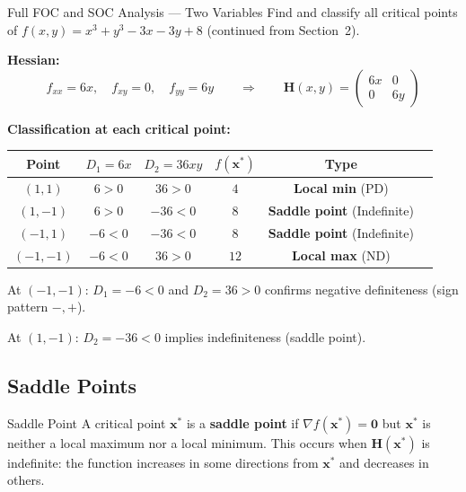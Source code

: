 \documentclass[12pt, a4paper]{article}
\theoremstyle{definition}
\newcommand{\bx}{\mathbf{x}}
\newcommand{\bz}{\mathbf{0}}
\newcommand{\bH}{\mathbf{H}}
\begin{document}
\begin{exbox}{Full FOC and SOC Analysis --- Two Variables}
Find and classify all critical points of
$f(x,y) = x^3 + y^3 - 3x - 3y + 8$ (continued from Section~2).

\textbf{Hessian:}
\[
  f_{xx} = 6x, \quad f_{xy} = 0, \quad f_{yy} = 6y
  \qquad\Rightarrow\qquad
  \bH(x,y) = \begin{pmatrix} 6x & 0 \\ 0 & 6y \end{pmatrix}
\]

\textbf{Classification at each critical point:}
\smallskip

\begin{center}
\begin{tabular}{cccccl}
  \toprule
  \rowcolor{tabhead}
  \color{white}Point & \color{white}$D_1 = 6x$ & \color{white}$D_2 = 36xy$
  & \color{white}$f(\bx^*)$ & \color{white}Type \\
  \midrule
  $(1,1)$   & $6>0$  & $36>0$   & $4$  & \textbf{Local min} (PD) \\
  \rowcolor{tabeven}
  $(1,-1)$  & $6>0$  & $-36<0$  & $8$  & \textbf{Saddle point} (Indefinite) \\
  $(-1,1)$  & $-6<0$ & $-36<0$  & $8$  & \textbf{Saddle point} (Indefinite) \\
  \rowcolor{tabeven}
  $(-1,-1)$ & $-6<0$ & $36>0$   & $12$ & \textbf{Local max} (ND) \\
  \bottomrule
\end{tabular}
\end{center}

\medskip
At $(-1,-1)$: $D_1=-6<0$ and $D_2=36>0$ confirms negative definiteness
(sign pattern $-,+$). \checkmark

At $(1,-1)$: $D_2=-36<0$ implies indefiniteness (saddle point). \checkmark
\end{exbox}

\subsection{Saddle Points}

\begin{defbox}{Saddle Point}
A critical point $\bx^*$ is a \textbf{saddle point} if $\nabla f(\bx^*)=\bz$
but $\bx^*$ is neither a local maximum nor a local minimum. This occurs when
$\bH(\bx^*)$ is indefinite: the function increases in some directions from
$\bx^*$ and decreases in others.
\end{defbox}
\end{document}
